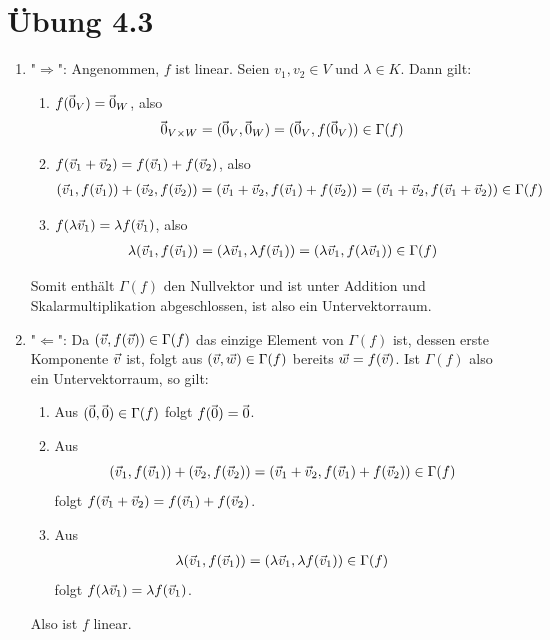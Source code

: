 \documentclass{article}
\begin{document}
\section*{Übung 4.3}
\separator


\begin{enumerate}
	\item "$\Longrightarrow$": Angenommen, $f$ ist linear. Seien $v_1, v_2 \in V$ und $\lambda \in K$. Dann gilt:
	\begin{enumerate}
		\item $f(\kern-1.2pt\vec{\kern1.2pt 0}_V) = \kern-1.2pt\vec{\kern1.2pt 0}_W$, also
		\begin{align*}
			\kern-1.2pt\vec{\kern1.2pt 0}_{V \times W} = (\kern-1.2pt\vec{\kern1.2pt 0}_V, \kern-1.2pt\vec{\kern1.2pt 0}_W) = (\kern-1.2pt\vec{\kern1.2pt 0}_V, f(\kern-1.2pt\vec{\kern1.2pt 0}_V)) \in \Gamma(f)
		\end{align*}
		\item $f(\vec{v}_1 + \vec{v}_2) = f(\vec{v}_1) + f(\vec{v}_2)$, also
		\begin{align*}
			(\vec{v}_1, f(\vec{v}_1)) + (\vec{v}_2, f(\vec{v}_2))
			=
			(\vec{v}_1 + \vec{v}_2, f(\vec{v}_1) + f(\vec{v}_2))
			=
			(\vec{v}_1 + \vec{v}_2, f(\vec{v}_1 + \vec{v}_2)) \in \Gamma(f)
		\end{align*}
		\item $f(\lambda \vec{v}_1) = \lambda f(\vec{v}_1)$, also
		\begin{align*}
			\lambda(\vec{v}_1, f(\vec{v}_1))
			=
			(\lambda \vec{v}_1, \lambda f(\vec{v}_1))
			=
			(\lambda \vec{v}_1, f(\lambda \vec{v}_1))
			\in
			\Gamma(f)
		\end{align*}
	\end{enumerate}
	Somit enthält $\Gamma(f)$ den Nullvektor und ist unter Addition und Skalarmultiplikation abgeschlossen, ist also ein Untervektorraum.
	\item "$\Longleftarrow$": Da $(\vec{v}, f(\vec{v})) \in \Gamma(f)$ das einzige Element von $\Gamma(f)$ ist, dessen erste Komponente $\vec{v}$ ist, folgt aus $(\vec{v}, \vec{w}) \in \Gamma(f)$ bereits $\vec{w} = f(\vec{v})$. Ist $\Gamma(f)$ also ein Untervektorraum, so gilt:
	\begin{enumerate}
		\item Aus $(\kern-1.2pt\vec{\kern1.2pt 0}, \kern-1.2pt\vec{\kern1.2pt 0}) \in \Gamma(f)$ folgt $f(\kern-1.2pt\vec{\kern1.2pt 0}) = \kern-1.2pt\vec{\kern1.2pt 0}$.
		\item Aus $$(\vec{v}_1, f(\vec{v}_1)) + (\vec{v}_2, f(\vec{v}_2)) = (\vec{v}_1 + \vec{v}_2, f(\vec{v}_1) + f(\vec{v}_2)) \in \Gamma(f)$$ folgt $f(\vec{v}_1 + \vec{v}_2) = f(\vec{v}_1) + f(\vec{v}_2)$.
		\item Aus 
		\begin{align*}
			\lambda(\vec{v}_1, f(\vec{v}_1))
			=
			(\lambda \vec{v}_1, \lambda f(\vec{v}_1)) \in \Gamma(f)
		\end{align*}
		folgt $f(\lambda \vec{v}_1) = \lambda f(\vec{v}_1)$.
	\end{enumerate}
	Also ist $f$ linear.
\end{enumerate}
\end{document}
